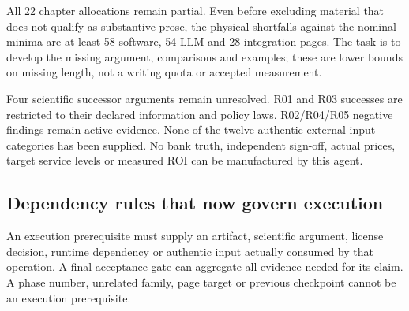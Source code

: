 \documentclass[
  10pt,
]{article}
\begin{document}
All 22 chapter allocations remain partial. Even before excluding
material that does not qualify as substantive prose, the physical
shortfalls against the nominal minima are at least 58 software, 54 LLM
and 28 integration pages. The task is to develop the missing argument,
comparisons and examples; these are lower bounds on missing length, not
a writing quota or accepted measurement.

Four scientific successor arguments remain unresolved. R01 and R03
successes are restricted to their declared information and policy laws.
R02/R04/R05 negative findings remain active evidence. None of the twelve
authentic external input categories has been supplied. No bank truth,
independent sign-off, actual prices, target service levels or measured
ROI can be manufactured by this agent.

\hypertarget{dependency-rules-that-now-govern-execution}{%
\subsection{Dependency rules that now govern
execution}\label{dependency-rules-that-now-govern-execution}}

An execution prerequisite must supply an artifact, scientific argument,
license decision, runtime dependency or authentic input actually
consumed by that operation. A final acceptance gate can aggregate all
evidence needed for its claim. A phase number, unrelated family, page
target or previous checkpoint cannot be an execution prerequisite.
\end{document}
